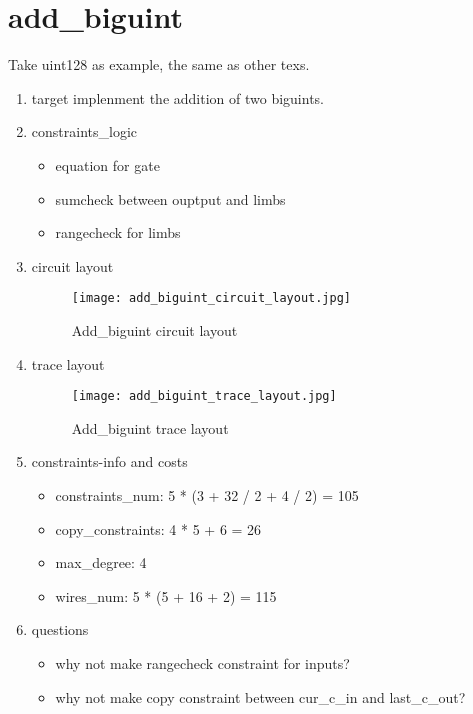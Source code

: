 \section{add_biguint}
\label{add_biguint}

Take uint128 as example, the same as other texs.

\begin{enumerate}
    \item target
        implenment the addition of two biguints.
    \item constraints_logic
        \begin{itemize}
            \item equation for gate
            \item sumcheck between ouptput and limbs
            \item rangecheck for limbs
        \end{itemize}
    \item circuit layout
        \begin{figure}[!ht]
            \centering
            \texttt{[image: add\_biguint\_circuit\_layout.jpg]}
            \caption{Add_biguint circuit layout}
            \label{fig:add_biguint_circuit_layout}
        \end{figure}

    \item trace layout
        \begin{figure}[!ht]
            \centering
            \texttt{[image: add\_biguint\_trace\_layout.jpg]}
            \caption{Add_biguint trace layout}
            \label{fig:add_biguint_trace_layout}
        \end{figure}
    
    \item constraints-info and costs
        \begin{itemize}
            \item constraints_num: 5 * (3 + 32 / 2 + 4 / 2) = 105
            \item copy_constraints: 4 * 5 + 6 = 26
            \item max_degree: 4
            \item wires_num: 5 * (5 + 16 + 2) = 115
        \end{itemize}

    \item questions
        \begin{itemize}
            \item why not make rangecheck constraint for inputs?
            \item why not make copy constraint between cur_c_in and last_c_out?
        \end{itemize}

\end{enumerate}
